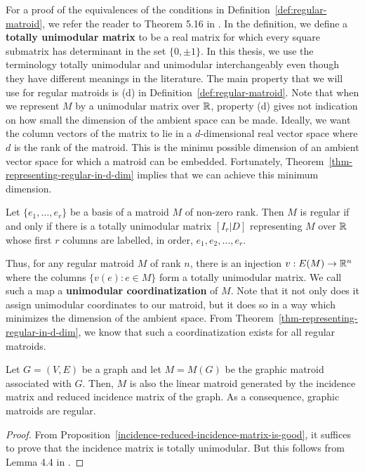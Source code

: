 \documentclass{puthesis-UG}
\begin{document}
For a proof of the equivalences of the conditions in Definition~\ref{def:regular-matroid}, we refer the reader to Theorem 5.16 in \cite{10.5555/1197093}. In the definition, we define a \textbf{totally unimodular matrix} to be a real matrix for which every square submatrix has determinant in the set $\{0, \pm 1\}$. In this thesis, we use the terminology totally unimodular and unimodular interchangeably even though they have different meanings in the literature. The main property that we will use for regular matroids is (d) in Definition~\ref{def:regular-matroid}. Note that when we represent $M$ by a unimodular matrix over $\mathbb{R}$, property (d) gives not indication on how small the dimension of the ambient space can be made. Ideally, we want the column vectors of the matrix to lie in a $d$-dimensional real vector space where $d$ is the rank of the matroid. This is the minimu possible dimension of an ambient vector space for which a matroid can be embedded. Fortunately, Theorem~\ref{thm-representing-regular-in-d-dim} implies that we can achieve this minimum dimension.

\begin{thm} \label{thm-representing-regular-in-d-dim}
	Let $\{e_1, \ldots, e_r\}$ be a basis of a matroid $M$ of non-zero rank. Then $M$ is regular if and only if there is a totally unimodular matrix $[I_r | D]$ representing $M$ over $\mathbb{R}$ whose first $r$ columns are labelled, in order, $e_1, e_2, \ldots, e_r$. 
\end{thm}

Thus, for any regular matroid $M$ of rank $n$, there is an injection $v : E(M) \to \mathbb{R}^n$ where the columns $\{v(e) : e \in M\}$ form a totally unimodular matrix. We call such a map a \textbf{unimodular coordinatization} of $M$. Note that it not only does it assign unimodular coordinates to our matroid, but it does so in a way which minimizes the dimension of the ambient space. From Theorem~\ref{thm-representing-regular-in-d-dim}, we know that such a coordinatization exists for all regular matroids. 

\begin{prop} \label{graphic-matroid-is-regular-prop}
	Let $G = (V, E)$ be a graph and let $M = M(G)$ be the graphic matroid associated with $G$. Then, $M$ is also the linear matroid generated by the incidence matrix and reduced incidence matrix of the graph. As a consequence, graphic matroids are regular.
\end{prop}

\begin{proof}
	From Proposition~\ref{incidence-reduced-incidence-matrix-is-good}, it suffices to prove that the incidence matrix is totally unimodular. But this follows from Lemma 4.4 in \cite{fujishige}. 
\end{proof}
\end{document}
